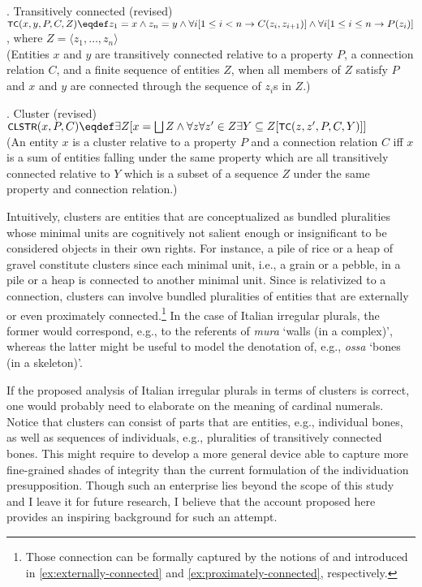 	\ex. Transitively connected (revised)\\
    $\cnst{tc}(x,y,P,C,Z) \eqdef z_1 = x \wedge z_n = y \wedge \forall i[1 \leq i < n \rightarrow C(z_i,z_{i+1})]\\
    \wedge \forall i[1 \leq i \leq n \rightarrow P(z_i)]$, where $Z = \langle z_1, \dots, z_n\rangle$\\
    (Entities $x$ and $y$ are transitively connected relative to a property $P$, a connection relation $C$, and a finite sequence of entities $Z$, when all members of $Z$ satisfy $P$ and $x$ and $y$ are connected through the sequence of $z_i$s in $Z$.)\label{ex:transitively-connected-new2}
	
	\ex. Cluster (revised)\\
    $\cnst{clstr}(x,P,C) \eqdef \exists Z[x = \bigsqcup Z \wedge \forall z \forall z' \in Z \exists Y \subseteq Z[\cnst{tc}(z,z',P,C,Y)]]$\\
    (An entity $x$ is a cluster relative to a property $P$ and a connection relation $C$ iff $x$ is a sum of entities falling under the same property which are all transitively connected relative to $Y$ which is a subset of a sequence $Z$ under the same property and connection relation.)\label{ex:cluster-new2}
    
    Intuitively, clusters are entities that are conceptualized as bundled pluralities whose minimal units are cognitively not salient enough or insignificant to be considered objects in their own rights. For instance, a pile of rice or a heap of gravel constitute clusters since each minimal unit, i.e., a grain or a pebble, in a pile or a heap is connected to another minimal unit. Since  is relativized to a connection, clusters can involve bundled pluralities of entities that are externally or even proximately connected.\footnote{Those connection can be formally captured by the notions of  and  introduced in \ref{ex:externally-connected} and \ref{ex:proximately-connected}, respectively.} In the case of Italian irregular plurals, the former would correspond, e.g., to the referents of \textit{mura} `walls (in a complex)', whereas the latter might be useful to model the denotation of, e.g., \textit{ossa} `bones (in a skeleton)'.
    
	If the proposed analysis of Italian irregular plurals in terms of clusters is correct, one would probably need to elaborate on the meaning of cardinal numerals. Notice that clusters can consist of parts that are  entities, e.g., individual bones, as well as sequences of individuals, e.g., pluralities of transitively connected bones. This might require to develop a more general device able to capture more fine-grained shades of integrity than the current formulation of the individuation presupposition. Though such an enterprise lies beyond the scope of this study and I leave it for future research, I believe that the account proposed here provides an inspiring background for such an attempt.
	
